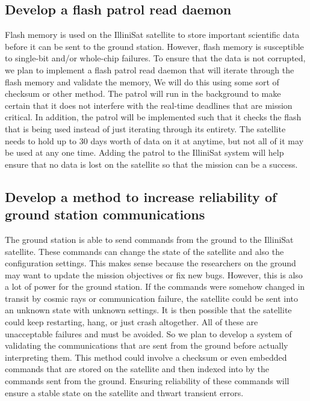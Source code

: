 \subsection{Develop a flash patrol read daemon}
Flash memory is used on the IlliniSat satellite to store important scientific data before it can be sent to the ground station. However, flash memory is susceptible to single-bit and/or whole-chip failures. To ensure that the data is not corrupted, we plan to implement a flash patrol read daemon that will iterate through the flash memory and validate the memory, We will do this using some sort of checksum or other method. The patrol will run in the background to make certain that it does not interfere with the real-time deadlines that are mission critical. In addition, the patrol will be implemented such that it checks the flash that is being used instead of just iterating through its entirety. The satellite needs to hold up to 30 days worth of data on it at anytime, but not all of it may be used at any one time. Adding the patrol to the IlliniSat system will help ensure that no data is lost on the satellite so that the mission can be a success. 

\subsection{Develop a method to increase reliability of ground station
communications}
The ground station is able to send commands from the ground to the IlliniSat satellite. These commands
can change the state of the satellite and also the configuration settings. This makes sense because the
researchers on the ground may want to update the mission objectives or fix new bugs. However, this is
also a lot of power for the ground station. If the commands were somehow changed in transit by cosmic 
rays or communication failure, the satellite could be sent into an unknown state with unknown settings. 
It is then possible that the satellite could keep restarting, hang, or just crash altogether. All of these are
unacceptable failures and must be avoided. So we plan to develop a system of validating the 
communications that are sent from the ground before actually interpreting them. This method could 
involve a checksum or even embedded commands that are stored on the satellite and then indexed into
by the commands sent from the ground. Ensuring reliability of these commands will ensure a stable state
on the satellite and thwart transient errors.

